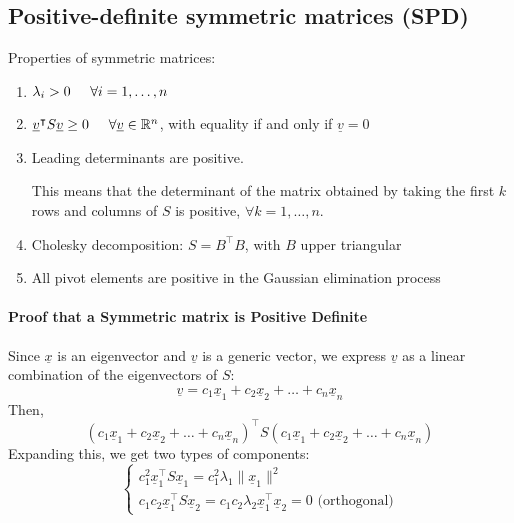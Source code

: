 \subsection*{Positive-definite symmetric matrices (SPD)}
Properties of symmetric matrices:
\begin{enumerate}[i]
    \item $\lambda_i > 0 \hspace{0.5cm} \forall i = 1, \dots, n$
    \item $\underline{v}^\intercal S \underline{v} \geq 0 \hspace{0.5cm} \forall \underline{v} \in \mathbb{R}^n$, with equality if and only if $\underline{v} = 0$
    \item Leading determinants are positive. \\
    \begin{multicols}{2}
        \begin{center}
        \end{center}

        This means that the determinant of the matrix obtained by taking the first $k$ rows and columns of $S$ is positive, $\forall k = 1, \dots, n$.
    \end{multicols}

    \item Cholesky decomposition: $S = B^\intercal B$, with $B$ upper triangular
    \item All pivot elements are positive in the Gaussian elimination process
\end{enumerate}

\paragraph{Proof that a Symmetric matrix is Positive Definite}
Since \(\underline{x}\) is an eigenvector and \(\underline{v}\) is a generic vector, we express \(\underline{v}\) as a linear combination of the eigenvectors of \(S\):
\[
\underline{v} = c_1 \underline{x}_1 + c_2 \underline{x}_2 + \dots + c_n \underline{x}_n
\]
Then,
\[
(c_1 \underline{x}_1 + c_2 \underline{x}_2 + \dots + c_n \underline{x}_n)^\intercal S (c_1 \underline{x}_1 + c_2 \underline{x}_2 + \dots + c_n \underline{x}_n)
\]
Expanding this, we get two types of components:
\[
\begin{cases}
c_1^2 \underline{x}_1^\intercal S \underline{x}_1 = c_1^2 \lambda_1 \|\underline{x}_1\|^2\\
c_1 c_2 \underline{x}_1^\intercal S \underline{x}_2 = c_1 c_2 \lambda_2 \underline{x}_1^\intercal \underline{x}_2 = 0 \text{ (orthogonal)}
\end{cases}
\]

